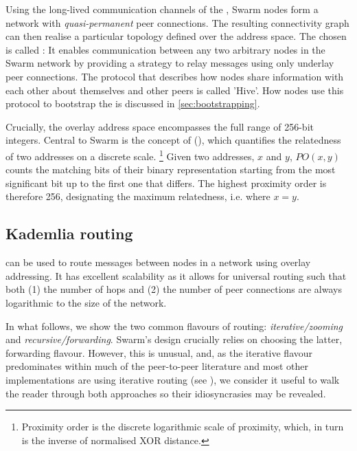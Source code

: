 Using the long-lived communication channels of the , Swarm nodes form a network with \emph{quasi-permanent} peer connections. The resulting connectivity graph can then realise a particular topology defined over the address space. The  chosen is called : It enables communication between any two arbitrary nodes in the Swarm network by providing a strategy to relay messages using only underlay peer connections. The protocol that describes how nodes share information with each other about themselves and other peers is called 'Hive'. How nodes use this protocol to bootstrap the  is discussed in \ref{sec:bootstrapping}. 

Crucially, the overlay address space encompasses the full range of 256-bit integers. Central to Swarm is the concept of  (), which quantifies the relatedness of two addresses on a discrete scale.%
%
\footnote{Proximity order is the discrete logarithmic scale of proximity, which, in turn is the inverse of normalised XOR distance.%
}
%
Given two addresses, $x$ and $y$, $\mathit{PO}(x,y)$ counts the matching bits of their binary representation starting from the most significant bit up to the first one that differs. The highest proximity order is therefore 256, designating the maximum relatedness, i.e. where $x=y$.

\subsection{Kademlia routing \statusgreen}\label{sec:kademlia-routing}

 can be used to route messages between nodes in a network using overlay addressing. It has excellent scalability as it allows for universal routing such that both (1) the number of hops and (2) the number of peer connections are always logarithmic to the size of the network. 

In what follows, we show the two common flavours of routing: \emph{iterative/zooming} and \emph{recursive/forwarding}. Swarm's design crucially relies on choosing the latter, forwarding flavour. However, this is unusual, and, as the iterative flavour predominates within much of the peer-to-peer literature and most other implementations are using iterative routing  (see \cite{maymounkov2002kademlia,baumgart2007s,lua2005survey}), we consider it useful to walk the reader through both approaches so their idiosyncrasies may be revealed.

